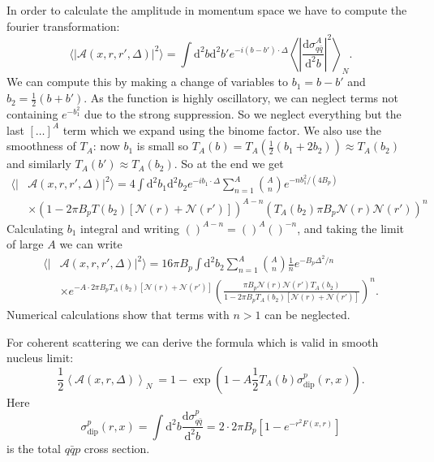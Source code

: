 \documentclass[a4paper,12pt]{article}
\newcommand{\der}{\mathrm{d}}
\newcommand{\A}{\mathcal{A}}
\newcommand{\N}{\mathcal{N}}
\begin{document}
In order to calculate the amplitude in momentum space we have to compute the fourier transformation:
\begin{equation}
	\langle |\A(x,r,r',\Delta)|^2 \rangle = \int \der^2 b \der^2 b' e^{-i(b-b')\cdot \Delta} \left \langle \left| \frac{\der \sigma_{q\bar q}^A}{\der^2 b} \right|^2 \right \rangle_N.
\end{equation}
We can compute this by making a change of variables to $b_1 = b-b'$ and $b_2 = \frac{1}{2}(b+b')$. As the function is highly oscillatory, we can neglect terms not containing $e^{-b_1^2}$ due to the strong suppression. So we neglect everything but the last $[\dots ]^A$ term which we expand using the binome factor. We also use the smoothness of $T_A$: now $b_1$ is small so $T_A(b)=T_A(\frac{1}{2}(b_1+2b_2)) \approx T_A(b_2)$ and similarly $T_A(b')\approx T_A(b_2)$. So at the end we get
\begin{equation}
\begin{split}
	\langle |&\A(x,r,r',\Delta)|^2 \rangle = 4\int \der^2 b_1 \der^2 b_2 e^{-ib_1 \cdot \Delta} \sum_{n=1}^A \binom{A}{n} e^{-nb_1^2/(4B_p)}  \\
	& \times \left(1-2\pi B_p T(b_2)[\N(r)+\N(r')] \right)^{A-n} \left( T_A(b_2)\pi B_p \N(r)\N(r') \right)^n 
\end{split}
\end{equation}
Calculating $b_1$ integral and writing $()^{A-n} = ()^A ()^{-n}$, and taking the limit of large $A$ we can write
\begin{equation}
\begin{split}
	\langle |&\A(x,r,r',\Delta)|^2 \rangle = 16\pi B_p \int \der^2 b_2  \sum_{n=1}^A \binom{A}{n} \frac{1}{n} e^{-B_p\Delta^2/n}  \\
	&\times e^{-A\cdot 2\pi B_p T_A(b_2)[\N(r)+\N(r')]} \left( \frac{\pi B_p \N(r)\N(r')T_A(b_2)}{1-2\pi B_p T_A(b_2) [ \N(r)+\N(r')]} \right)^n.
\end{split}
\end{equation}
Numerical calculations show that terms with $n>1$ can be neglected.

For coherent scattering we can derive \cite{PhysRevD.68.114005} the formula which is valid in smooth nucleus limit:
\begin{equation}
	\frac{1}{2}\left\langle \A(x,r,\Delta)\right\rangle_N\ = 1 - \exp\left( 1 - A\frac{1}{2}T_A(b)\sigma_\text{dip}^p(r,x) \right).
\end{equation}
Here
\begin{equation}
	\sigma_\text{dip}^p(r,x) = \int \der^2 b \frac{\der \sigma_{q\bar q}^p}{\der^2 b} = 2\cdot 2\pi B_p[1-e^{-r^2F(x,r)}]
\end{equation}
is the total $q\bar qp$ cross section.
\end{document}
